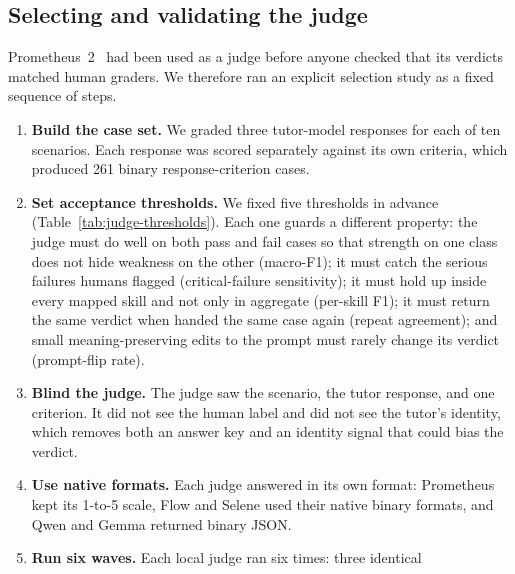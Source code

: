 \subsection{Selecting and validating the judge}
\label{sec:frq-judge-selection}
Prometheus~2~\cite{kim2024prometheus2} had been used as a judge before anyone
checked that its verdicts matched human graders. We therefore ran an explicit
selection study as a fixed sequence of steps. 

\begin{enumerate}
  \item \textbf{Build the case set.} We graded three tutor-model responses for
  each of ten scenarios. Each response was scored separately against its own
  criteria, which produced 261 binary response-criterion cases.
  \item \textbf{Set acceptance thresholds.} We fixed five thresholds in advance
  (Table~\ref{tab:judge-thresholds}). Each one guards a different property: the
  judge must do well on both pass and fail cases so that strength on one class
  does not hide weakness on the other (macro-F1); it must catch the serious
  failures humans flagged (critical-failure sensitivity); it must hold up inside
  every mapped skill and not only in aggregate (per-skill F1); it must return the
  same verdict when handed the same case again (repeat agreement); and small
  meaning-preserving edits to the prompt must rarely change its verdict
  (prompt-flip rate).
  \item \textbf{Blind the judge.} The judge saw the scenario, the tutor response,
  and one criterion. It did not see the human label and did not see the tutor's
  identity, which removes both an answer key and an identity signal that could
  bias the verdict. 
  \item \textbf{Use native formats.} Each judge answered in its own format:
  Prometheus kept its 1-to-5 scale, Flow and Selene used their native binary
  formats, and Qwen and Gemma returned binary JSON. 
  \item \textbf{Run six waves.} Each local judge ran six times: three identical

\end{enumerate}
